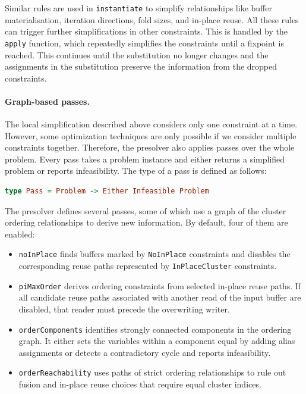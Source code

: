 Similar rules are used in \texttt{instantiate} to simplify relationships like buffer materialisation, iteration directions, fold sizes, and in-place reuse.
All these rules can trigger further simplifications in other constraints.
This is handled by the \texttt{apply} function, which repeatedly simplifies the constraints until a fixpoint is reached.
This continues until the substitution no longer changes and the assignments in the substitution preserve the information from the dropped constraints.

\paragraph{Graph-based passes.}

The local simplification described above considers only one constraint at a time.
However, some optimization techniques are only possible if we consider multiple constraints together.
Therefore, the presolver also applies passes over the whole problem.
Every pass takes a problem instance and either returns a simplified problem or reports infeasibility.
The type of a pass is defined as follows:

\begin{lstlisting}[language=Haskell]
type Pass = Problem -> Either Infeasible Problem
\end{lstlisting}

The presolver defines several passes, some of which use a graph of the cluster ordering relationships to derive new information.
By default, four of them are enabled:

\begin{itemize}
    \item \texttt{noInPlace} finds buffers marked by \texttt{NoInPlace} constraints and disables the corresponding reuse paths represented by \texttt{InPlaceCluster} constraints.
    \item \texttt{piMaxOrder} derives ordering constraints from selected in-place reuse paths. If all candidate reuse paths associated with another read of the input buffer are disabled, that reader must precede the overwriting writer.
    \item \texttt{orderComponents} identifies strongly connected components in the ordering graph. It either sets the variables within a component equal by adding alias assignments or detects a contradictory cycle and reports infeasibility.
    \item \texttt{orderReachability} uses paths of strict ordering relationships to rule out fusion and in-place reuse choices that require equal cluster indices.
\end{itemize}

